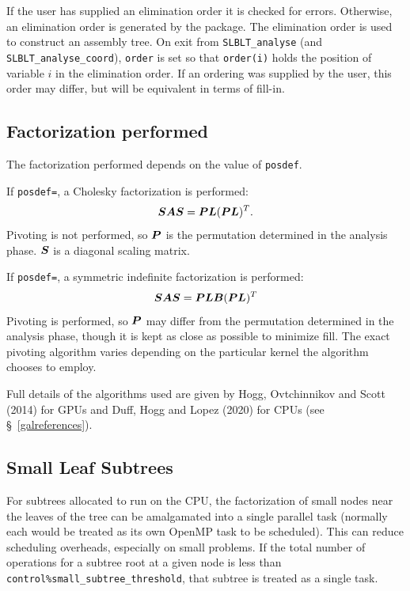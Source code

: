 \documentclass{galahad}
\newcommand{\packagename}{SLBLT}
\begin{document}
If the user has supplied an elimination order it is checked for errors.
Otherwise, an elimination order is generated by the package. The
elimination order is used to construct an assembly tree. On exit from
{\tt \packagename\_analyse} (and {\tt \packagename\_analyse\_coord}), 
{\tt order} is
set so that {\tt order(i)} holds the position of variable $i$ in the
elimination order. If an ordering was supplied by the user, this order may
differ, but will be equivalent in terms of fill-in.


\subsection{Factorization performed}
The factorization performed depends on the value of {\tt posdef}.

If {\tt posdef=\true}, a Cholesky factorization is performed:
\[
{\bm{S}}{\bm{A}}{\bm{S}} = {\bm{P}}{\bm{L}}({\bm{P}}{\bm{L}})^T.
\]
Pivoting is not performed, so ${\bm{P}}$ is the permutation determined in the
analysis phase. ${\bm{S}}$ is a diagonal scaling matrix.

If {\tt posdef=\false}, a symmetric indefinite factorization is performed:
\[
{\bm{S}}{\bm{A}}{\bm{S}} = {\bm{P}}{\bm{L}}{\bm{B}}({\bm{P}}{\bm{L}})^T
\]
Pivoting is performed, so ${\bm{P}}$ may differ from the permutation determined
in the analysis phase, though it is kept as close as possible to minimize fill.
The exact pivoting algorithm varies depending on the particular kernel the
algorithm chooses to employ.

Full details of the algorithms used are given by
Hogg, Ovtchinnikov and Scott (2014) for GPUs and 
Duff, Hogg and Lopez (2020) for CPUs (see \S~\ref{galreferences}).

\subsection{Small Leaf Subtrees}
\label{small-leaf-subtrees}\label{small-leaf}
For subtrees allocated to run on the CPU, the factorization of small nodes near
the leaves of the tree can be amalgamated into a single parallel task (normally
each would be treated as its own OpenMP task to be scheduled). This can reduce
scheduling overheads, especially on small problems. If the total number of
operations for a subtree root at a given node is less than
{\tt control\%small\_subtree\_threshold}, that subtree is treated as a 
single task.

\galreferences
\vspace*{1mm}
\end{document}
